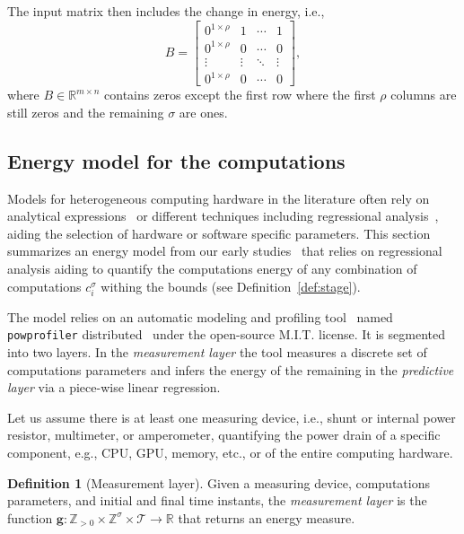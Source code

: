 \documentclass[letterpaper,10pt,journal,twoside]{IEEEtran}
\newcommand{\stt}[1]{{\small\tt #1}} %
\newcommand{\powprof}{\stt{powprofiler}}
\theoremstyle{definition}
\newtheorem{defn}{Definition}[section]
\begin{document}
The input matrix then includes the change in energy, i.e.,
\begin{equation}\label{eq:mat_B}
  B=\begin{bmatrix}
      0^{1\times\rho} & 1      & \cdots & 1      \\
      0^{1\times\rho} & 0      & \cdots & 0      \\ 
      \vdots          & \vdots & \ddots & \vdots \\
      0^{1\times\rho} & 0      & \cdots & 0   
  \end{bmatrix},
\end{equation}
where $B\in\mathbb{R}^{m\times n}$ contains zeros except the first row where the first $\rho$ columns are still zeros and the remaining $\sigma$ are ones. 

\subsection{Energy model for the computations}
\label{sec:mod-com}

Models for heterogeneous computing hardware in the literature often rely on analytical expressions~\cite{marowka2017energy,goraczko2008energy,calore2015energy,yang2017designing} or different techniques including regressional analysis~\cite{bailey2014adaptive,ma2012holistic,seewald2019coarse}, aiding the selection of hardware or software specific parameters. This section summarizes an energy model from our early studies~\cite{seewald2019component,seewald2019coarse} that relies on regressional analysis aiding to quantify the computations energy of any combination of computations $c_i^\sigma$ withing the bounds (see Definition~\ref{def:stage}).  

The model relies on an automatic modeling and profiling tool~\cite{seewald2019coarse} named \powprof{} distributed~\cite{powprofiler} under the open-source M.I.T. license. It is segmented into two layers. In the \emph{measurement layer} the tool measures a discrete set of computations parameters and infers the energy of the remaining in the \emph{predictive layer} via a piece-wise linear regression.

Let us assume there is at least one measuring device, i.e., shunt or internal power resistor, multimeter, or amperometer, quantifying the power drain of a specific component, e.g., CPU, GPU, memory, etc., or of the entire computing hardware.

\begin{defn}[Measurement layer]\label{def:meas}
  Given a measuring device, computations parameters, and initial and final time instants, the \emph{measurement layer} is the function $\mathbf{g}:\mathbb{Z}_{>0}\times\mathbb{Z}^\sigma\times\mathcal{T}\rightarrow\mathbb{R}$ that returns an energy measure.
\end{defn}
\end{document}
